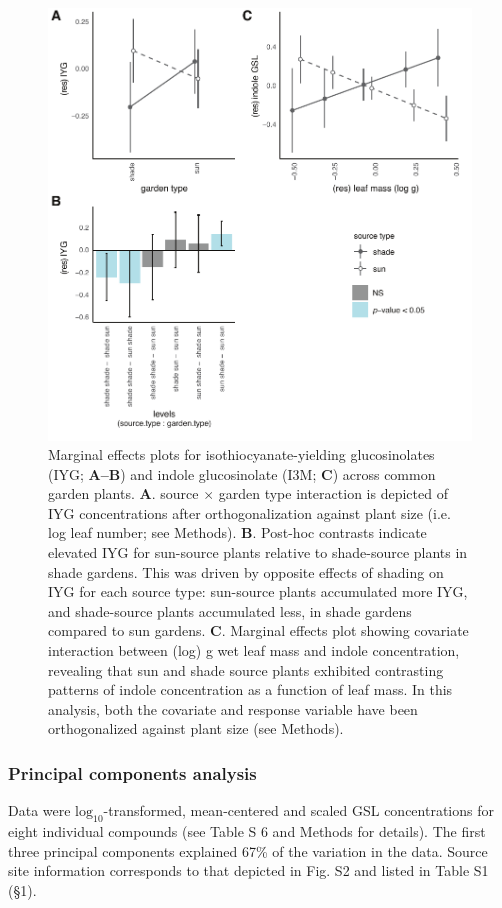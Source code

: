 \documentclass[11pt, oneside]{amsart}
\begin{document}
\begin{figure}[!hptb]
\centering
\includegraphics[scale=0.8]{GLS_effects_breakdown_panel}
\caption{Marginal effects plots for isothiocyanate-yielding glucosinolates (IYG; \textbf{A--B}) and indole glucosinolate (I3M; \textbf{C}) across common garden plants. \textbf{A}. source $\times$ garden type interaction is depicted of IYG concentrations after orthogonalization against plant size (i.e. log leaf number; see Methods). \textbf{B}. Post-hoc contrasts indicate elevated IYG for sun-source plants relative to shade-source plants in shade gardens. This was driven by opposite effects of shading on IYG for each source type: sun-source plants accumulated more IYG, and shade-source plants accumulated less, in shade gardens compared to sun gardens. \textbf{C}. Marginal effects plot showing covariate interaction between (log) g wet leaf mass and indole concentration, revealing that sun and shade source plants exhibited contrasting patterns of indole concentration as a function of leaf mass. In this analysis, both the covariate and response variable have been orthogonalized against plant size (see Methods).}
\label{FigS9}
\end{figure}


\clearpage
\subsubsection{Principal components analysis}
Data were $\text{log}_{10}$-transformed, mean-centered and scaled GSL concentrations for eight individual compounds (see Table S 6 and Methods for details). The first three principal components explained 67\% of the variation in the data. Source site information corresponds to that depicted in Fig. S2 and listed in Table S1 (\S1).
\end{document}
